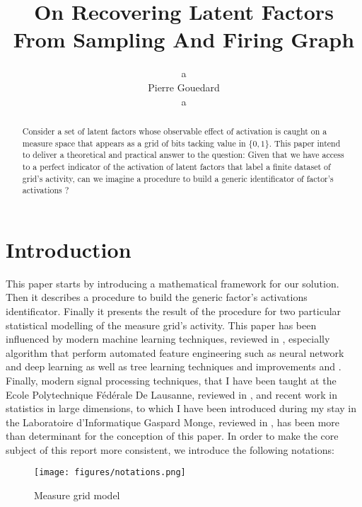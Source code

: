 \documentclass[a4paper, 11pt]{article}
\begin{document}
\title{\textbf{On Recovering Latent Factors From Sampling And Firing Graph}}

\author{
{\color{white} a}\\
Pierre Gouedard\\
{\color{white} a}\\
}
\maketitle

\setlength{\parindent}{0pt}

\begin{abstract}
Consider a set of latent factors whose observable effect of activation is caught on a measure space that appears as a grid of bits tacking value in $\{0, 1 \}$. This paper intend to deliver a theoretical and practical answer to the question: Given that we have access to a perfect indicator of the activation of latent factors that label a finite dataset of grid's activity, can we imagine a procedure to build a generic identificator of factor's activations ?
\end{abstract}


\section{Introduction}

This paper starts by introducing a mathematical framework for our solution. Then it describes a procedure to build the generic factor's activations identificator. Finally it presents the result of the procedure for two particular statistical modelling of the measure grid's activity. This paper has been influenced by modern machine learning techniques, reviewed in \cite{PCML-1}, especially algorithm that perform automated feature engineering such as neural network and deep learning  \cite{PCML-2} as well as tree learning techniques \cite{PCML-3} and improvements \cite{PCML-4} and \cite{PCML-5}. Finally, modern signal processing techniques, that I have been taught at the Ecole Polytechnique F\'ed\'erale De Lausanne, reviewed in \cite{SP-1}, and recent work in statistics in large dimensions, to which I have been introduced during my stay in the Laboratoire d'Informatique Gaspard Monge, reviewed in \cite{TAO-1}, has been more than determinant for the conception of this paper. In order to make the core subject of this report more consistent, we introduce the following notations:

 \begin{figure}[h]
 \centering
   \texttt{[image: figures/notations.png]}
 \caption{Measure grid model}
 \label{fig:model_overview}
\end{figure}
\end{document}
